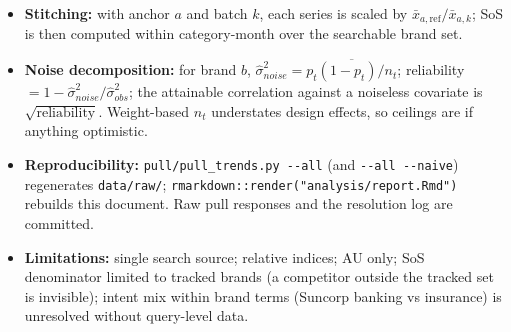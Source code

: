 \documentclass[
]{article}
\providecommand{\tightlist}{%
  \setlength{\itemsep}{0pt}\setlength{\parskip}{0pt}}
\begin{document}
\begin{itemize}
\tightlist
\item
  \textbf{Stitching:} with anchor \(a\) and batch \(k\), each series is
  scaled by \(\bar{x}_{a,\text{ref}} / \bar{x}_{a,k}\); SoS is then
  computed within category-month over the searchable brand set.
\item
  \textbf{Noise decomposition:} for brand \(b\),
  \(\hat\sigma^2_{noise} = \overline{p_t(1-p_t)/n_t}\); reliability
  \(= 1 - \hat\sigma^2_{noise} / \hat\sigma^2_{obs}\); the attainable
  correlation against a noiseless covariate is
  \(\sqrt{\text{reliability}}\). Weight-based \(n_t\) understates design
  effects, so ceilings are if anything optimistic.
\item
  \textbf{Reproducibility:} \texttt{pull/pull\_trends.py\ -\/-all} (and
  \texttt{-\/-all\ -\/-naive}) regenerates \texttt{data/raw/};
  \texttt{rmarkdown::render("analysis/report.Rmd")} rebuilds this
  document. Raw pull responses and the resolution log are committed.
\item
  \textbf{Limitations:} single search source; relative indices; AU only;
  SoS denominator limited to tracked brands (a competitor outside the
  tracked set is invisible); intent mix within brand terms (Suncorp
  banking vs insurance) is unresolved without query-level data.
\end{itemize}
\end{document}

